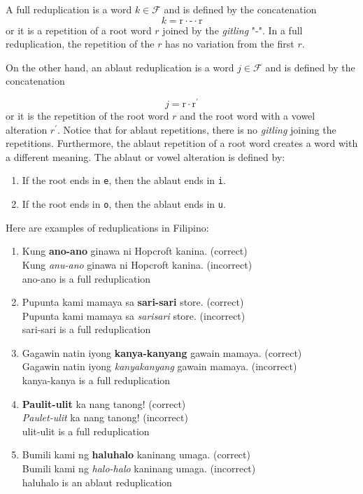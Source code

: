 A full reduplication is a word \(k \in \mathcal{F}\) and is defined by the concatenation
\[
      k = \text{r} \cdot \text{-} \cdot \text{r}
\]
or it is a repetition of a root word \(r\) joined by the \textit{\textit{gitling}} "-".
In a full reduplication, the repetition of the \(r\) has no variation from the first \(r\).

On the other hand, an ablaut reduplication is a word \(j \in \mathcal{F}\) and is defined by the
concatenation

\[
      j = \text{r} \cdot \text{r$^\prime$}
\]
or it is the repetition of the root word \(r\) and the root word with a vowel alteration \(r^\prime\). Notice
that for ablaut repetitions, there is no \textit{\textit{gitling}} joining the repetitions. Furthermore,
the ablaut repetition of a root word creates a word with a different meaning. The ablaut or vowel
alteration is defined by:

\begin{enumerate}
    \item If the root ends in \texttt{e}, then the ablaut ends in \texttt{i}. 
    \item If the root ends in \texttt{o}, then the ablaut ends in \texttt{u}.
\end{enumerate}

\begin{example}
      Here are examples of reduplications in Filipino:
\end{example}
\begin{enumerate}
      \item Kung \textbf{ano-ano} ginawa ni Hopcroft kanina. (correct) \\
            Kung \textit{anu-ano} ginawa ni Hopcroft kanina. (incorrect) \\
            ano-ano is a full reduplication
      \item Pupunta kami mamaya sa \textbf{sari-sari} store. (correct) \\
            Pupunta kami mamaya sa \textit{sarisari} store. (incorrect) \\
            sari-sari is a full reduplication
      \item Gagawin natin iyong \textbf{kanya-kanyang} gawain mamaya. (correct) \\
            Gagawin natin iyong \textit{kanyakanyang} gawain mamaya. (incorrect) \\
            kanya-kanya is a full reduplication
      \item \textbf{Paulit-ulit} ka nang tanong! (correct) \\
            \textit{Paulet-ulit} ka nang tanong! (incorrect) \\
            ulit-ulit is a full reduplication
      \item Bumili kami ng \textbf{haluhalo} kaninang umaga. (correct) \\
            Bumili kami ng \textit{halo-halo} kaninang umaga. (incorrect) \\
            haluhalo is an ablaut reduplication
\end{enumerate}

